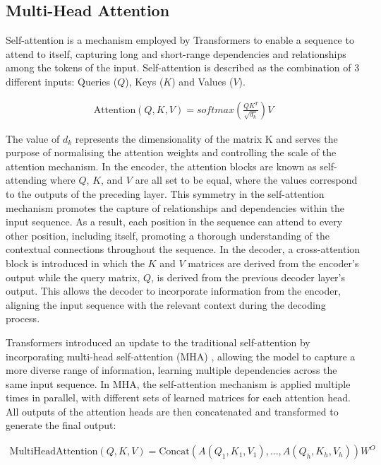 \subsection{Multi-Head Attention}

Self-attention is a mechanism employed by Transformers to enable a sequence to attend to itself, capturing long and short-range dependencies and relationships among the tokens of the input. Self-attention is described as the combination of 3 different inputs: Queries ($Q$), Keys ($K$) and Values ($V$).

\begin{equation}
    \begin{gathered}
        \text{Attention}(Q,K,V) = softmax \left( \frac{QK^T}{\sqrt{d_k} } \right) V
    \end{gathered}
    \label{eq:self_attention}
\end{equation}

The value of $d_{k}$ represents the dimensionality of the matrix K and serves the purpose of normalising the attention weights and controlling the scale of the attention mechanism. In the encoder, the attention blocks are known as self-attending where $Q$, $K$, and $V$ are all set to be equal, where the values correspond to the outputs of the preceding layer. This symmetry in the self-attention mechanism promotes the capture of relationships and dependencies within the input sequence. As a result, each position in the sequence can attend to every other position, including itself, promoting a thorough understanding of the contextual connections throughout the sequence. In the decoder, a cross-attention block is introduced in which the $K$ and $V$ matrices are derived from the encoder's output while the query matrix, $Q$, is derived from the previous decoder layer's output. This allows the decoder to incorporate information from the encoder, aligning the input sequence with the relevant context during the decoding process.

Transformers introduced an update to the traditional self-attention by incorporating multi-head self-attention (MHA) \cite{mha_paper}, allowing the model to capture a more diverse range of information, learning multiple dependencies across the same input sequence. In MHA, the self-attention mechanism is applied multiple times in parallel, with different sets of learned matrices for each attention head. All outputs of the attention heads are then concatenated and transformed to generate the final output:

\begin{equation}
    \begin{gathered}
        \text{MultiHeadAttention}(Q,K,V) = \text{Concat}\left( A(Q_{1}, K_{1}, V_{1}), ...,  A(Q_{h}, K_{h}, V_{h})\right) W^{O}
    \end{gathered}
    \label{eq:mha}
\end{equation}

